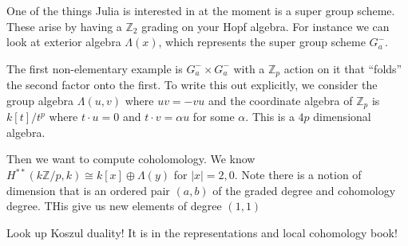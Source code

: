 \documentclass[12pt]{article}
\theoremstyle{nonumberbreak}
\theoremstyle{changebreak}
\theoremstyle{nonumberplain}
\theoremstyle{change}
\newcommand*{\bbZ}{\mathbb{Z}}
\begin{document}
One of the things Julia is interested in at the moment is a super group scheme. These arise by having a $\bbZ_2$ grading on your Hopf algebra.
For instance we can look at exterior algebra $\Lambda(x)$, which represents the super group scheme $G_a^-$. 

The first non-elementary example is $G_a^-\times G_a^-$ with a $\bbZ_p$ action on it that ``folds'' the second factor
onto the first. To write this out explicitly, we consider the group algebra $\Lambda(u,v)$ where $uv=-vu$ and the coordinate algebra of $\bbZ_p$
is $k[t]/t^p$ where $t\cdot u=0$ and $t\cdot v=\alpha u$ for some $\alpha$. This is a $4p$ dimensional algebra.

Then we want to compute coholomology. We know $H^{**}(k\bbZ/p,k)\cong k[x]\oplus\Lambda(y)$ for $|x|=2,0$.
Note there is a notion of dimension that is an ordered pair $(a,b)$ of the graded degree and cohomology degree.
THis give us new elements of degree $(1,1)$

Look up Koszul duality! It is in the representations and local cohomology book! 

\medskip

\printbibliography
\end{document}
